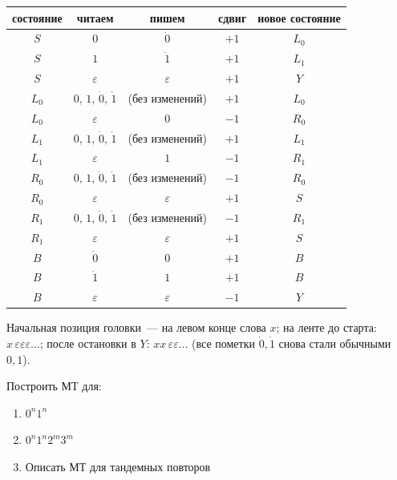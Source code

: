 \documentclass[12pt]{article}
\begin{document}
\begin{example}[МТ, вычисляющая $f(x) = xx$]
    	\begin{center}
    		\begin{tabular}{c|c|c|c|c}
    			состояние & читаем & пишем & сдвиг & новое состояние \\
    			\hline
    			$S$ & $0$ & $\dot 0$ & $+1$ & $L_0$ \\
    			$S$ & $1$ & $\dot 1$ & $+1$ & $L_1$ \\
    			$S$ & $\varepsilon$ & $\varepsilon$ & $+1$ & $Y$ \\
    			\hline
    			$L_0$ & $0,\, 1,\, \dot 0,\, \dot 1$ & (без изменений) & $+1$ & $L_0$ \\
    			$L_0$ & $\varepsilon$ & $0$ & $-1$ & $R_0$ \\
    			$L_1$ & $0,\, 1,\, \dot 0,\, \dot 1$ & (без изменений) & $+1$ & $L_1$ \\
    			$L_1$ & $\varepsilon$ & $1$ & $-1$ & $R_1$ \\
    			\hline
    			$R_0$ & $0,\, 1,\, \dot 0,\, \dot 1$ & (без изменений) & $-1$ & $R_0$ \\
    			$R_0$ & $\varepsilon$ & $\varepsilon$ & $+1$ & $S$ \\
    			$R_1$ & $0,\, 1,\, \dot 0,\, \dot 1$ & (без изменений) & $-1$ & $R_1$ \\
    			$R_1$ & $\varepsilon$ & $\varepsilon$ & $+1$ & $S$ \\
    			\hline
    			$B$ & $\dot 0$ & $0$ & $+1$ & $B$ \\
    			$B$ & $\dot 1$ & $1$ & $+1$ & $B$ \\
    			$B$ & $\varepsilon$ & $\varepsilon$ & $-1$ & $Y$ \\
    		\end{tabular}
    	\end{center}
    	
    	Начальная позиция головки~--- на левом конце слова $x$; на ленте до старта: $x\,\varepsilon\varepsilon\varepsilon\ldots$; после остановки в $Y$: $xx\,\varepsilon\varepsilon\ldots$ (все пометки $\dot0,\dot1$ снова стали обычными $0,1$).
    \end{example}
    
    \begin{problem}
    	Построить МТ для:
    	\begin{enumerate}
			\item $0^n1^n$
			\item $0^n1^n2^m3^m$
			\item Описать МТ для тандемных повторов
		\end{enumerate}
    \end{problem}
    
\end{document}
